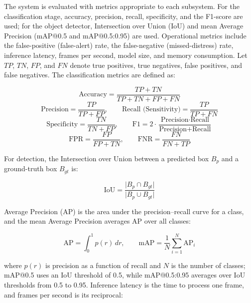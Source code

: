 \documentclass[12pt,a4paper]{report}
\begin{document}
The system is evaluated with metrics appropriate to each subsystem. For the classification stage, accuracy, precision, recall, specificity, and the F1-score are used; for the object detector, Intersection over Union (IoU) and mean Average Precision (mAP@0.5 and mAP@0.5:0.95) are used. Operational metrics include the false-positive (false-alert) rate, the false-negative (missed-distress) rate, inference latency, frames per second, model size, and memory consumption. Let $TP$, $TN$, $FP$, and $FN$ denote true positives, true negatives, false positives, and false negatives. The classification metrics are defined as:

\begin{equation}
\text{Accuracy} = \frac{TP + TN}{TP + TN + FP + FN}
\end{equation}
\begin{equation}
\text{Precision} = \frac{TP}{TP + FP}, \qquad
\text{Recall (Sensitivity)} = \frac{TP}{TP + FN}
\end{equation}
\begin{equation}
\text{Specificity} = \frac{TN}{TN + FP}, \qquad
\text{F1} = 2 \cdot \frac{\text{Precision} \cdot \text{Recall}}{\text{Precision} + \text{Recall}}
\end{equation}
\begin{equation}
\text{FPR} = \frac{FP}{FP + TN}, \qquad
\text{FNR} = \frac{FN}{FN + TP}
\end{equation}

For detection, the Intersection over Union between a predicted box $B_p$ and a ground-truth box $B_{gt}$ is:

\begin{equation}
\text{IoU} = \frac{\lvert B_p \cap B_{gt} \rvert}{\lvert B_p \cup B_{gt} \rvert}
\end{equation}

Average Precision (AP) is the area under the precision--recall curve for a class, and the mean Average Precision averages AP over all classes:

\begin{equation}
\text{AP} = \int_{0}^{1} p(r)\, dr, \qquad
\text{mAP} = \frac{1}{N}\sum_{i=1}^{N}\text{AP}_i
\end{equation}

where $p(r)$ is precision as a function of recall and $N$ is the number of classes; mAP@0.5 uses an IoU threshold of 0.5, while mAP@0.5:0.95 averages over IoU thresholds from 0.5 to 0.95. Inference latency is the time to process one frame, and frames per second is its reciprocal:
\end{document}
